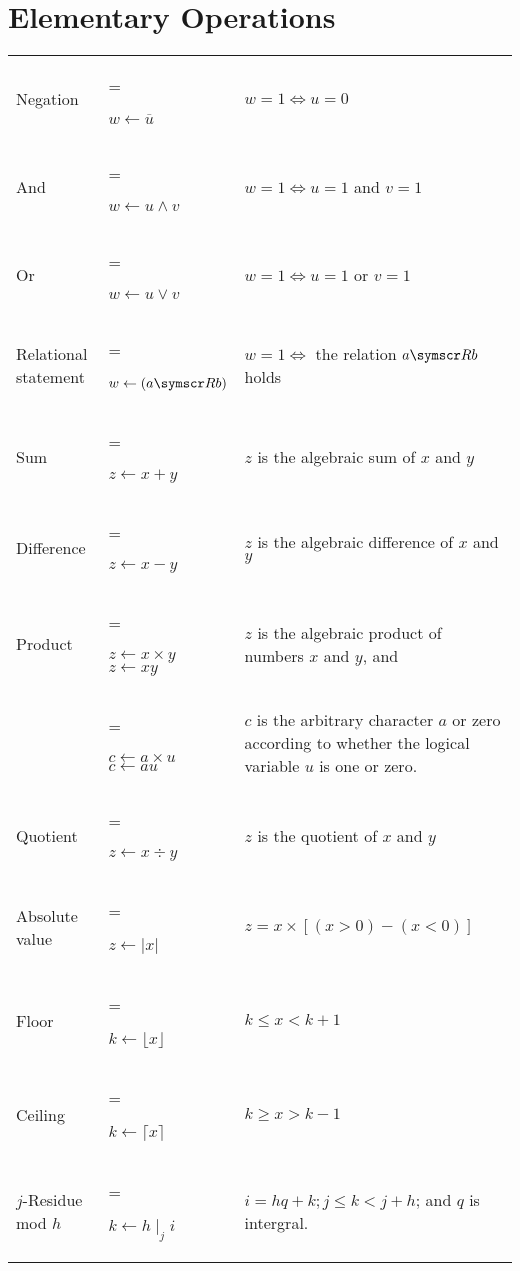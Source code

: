 \section{Elementary Operations}
\begin{tabularx}{\textwidth}{
	l
	>{\hsize=0.5\hsize\linewidth=\hsize\raggedright\arraybackslash}X
	X }
Negation
	& \( w \gets \overline{u} \)
	& \( w = 1 \iff u = 0 \)
	\\
And
	& \( w \gets u \land v \)
	& \( w = 1 \iff u = 1 \) and \( v = 1 \)
	\\
Or
	& \( w \gets u \lor v \)
	& \( w= 1 \iff u = 1 \) or \( v = 1 \)
	\\
Relational statement
	& \( w \gets (a \relsym b) \)
	& \( w = 1 \iff \) the relation \( a \relsym b \) holds
	\\
Sum
	& \( z \gets x + y \)
	& \( z \) is the algebraic sum of \( x \) and \( y \)
	\\
Difference
	& \( z \gets x − y \)
	& \( z \) is the algebraic difference of \(x\) and \(y\)
	\\
Product
	& \( z \gets x \times y \) \newline \( z \gets xy \)
	& \(z\) is the algebraic product of numbers \(x\) and \(y\), and
	\\
	& \( c \gets a \times u \) \newline \( c \gets au \)
	& \(c\) is the arbitrary character \(a\) or zero according to whether the logical variable \(u\) is one or zero.
	\\
Quotient
	& \( z \gets x \div y \)
	& \(z\) is the quotient of \(x\) and \(y\)
	\\
Absolute value
	& \( z \gets \lvert x \rvert \)
	& \( z = x \times [(x > 0) − (x < 0)] \)
	\\
Floor
	& \( k \gets \lfloor x \rfloor \)
	& \( k \leq x < k + 1 \)
	\\
Ceiling
	& \( k \gets \lceil x \rceil \)
	& \( k \geq x > k − 1 \)
	\\
\( j \)-Residue mod \( h \)
	& \( k \gets h \mid_j i \)
	& \( i = hq + k; j \leq k < j + h \); and \( q \) is intergral.
	\\
\end{tabularx}

